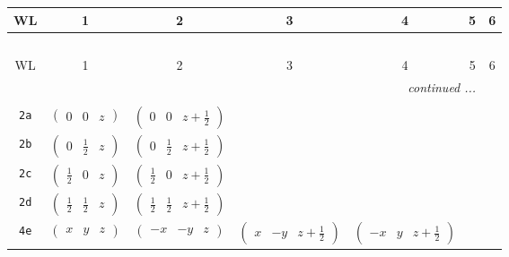 \documentclass[fleqn,9pt,landscape]{jsarticle}
\begin{document}
\begin{center}
\renewcommand{\arraystretch}{1.2}
\begin{longtable}{ccccccc}
 \hline \hline
WL & 1 & 2 & 3 & 4 & 5 & 6 \\ \hline \endfirsthead

\multicolumn{6}{l}{\tablename\ \thetable{}} \\
 \hline \hline
WL & 1 & 2 & 3 & 4 & 5 & 6 \\ \hline \endhead

 \hline \hline
\multicolumn{6}{r}{\footnotesize\it continued ...} \\ \endfoot

 \hline \hline
\multicolumn{6}{r}{} \\ \endlastfoot

{\tt 2a} & $ \begin{pmatrix} 0 & 0 & z \end{pmatrix} $ & $ \begin{pmatrix} 0 & 0 & z + \frac{1}{2} \end{pmatrix} $ & $  $ & $  $ \\ \hline
{\tt 2b} & $ \begin{pmatrix} 0 & \frac{1}{2} & z \end{pmatrix} $ & $ \begin{pmatrix} 0 & \frac{1}{2} & z + \frac{1}{2} \end{pmatrix} $ & $  $ & $  $ \\ \hline
{\tt 2c} & $ \begin{pmatrix} \frac{1}{2} & 0 & z \end{pmatrix} $ & $ \begin{pmatrix} \frac{1}{2} & 0 & z + \frac{1}{2} \end{pmatrix} $ & $  $ & $  $ \\ \hline
{\tt 2d} & $ \begin{pmatrix} \frac{1}{2} & \frac{1}{2} & z \end{pmatrix} $ & $ \begin{pmatrix} \frac{1}{2} & \frac{1}{2} & z + \frac{1}{2} \end{pmatrix} $ & $  $ & $  $ \\ \hline
{\tt 4e} & $ \begin{pmatrix} x & y & z \end{pmatrix} $ & $ \begin{pmatrix} - x & - y & z \end{pmatrix} $ & $ \begin{pmatrix} x & - y & z + \frac{1}{2} \end{pmatrix} $ & $ \begin{pmatrix} - x & y & z + \frac{1}{2} \end{pmatrix} $ \\
\end{longtable}
\end{center}
\end{document}
